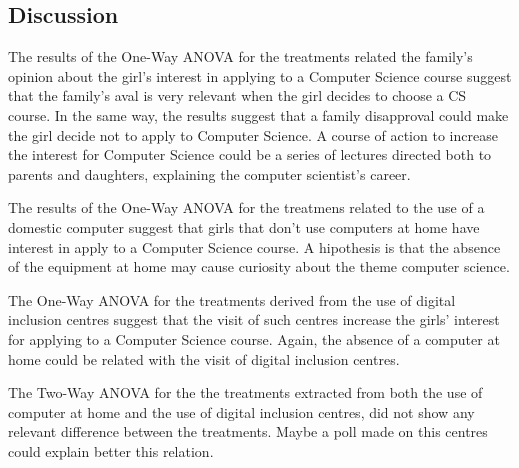 \subsection{Discussion}\label{subsec:discussion}%

The results of the One-Way ANOVA for the treatments related the family's opinion about the girl's interest in applying to a Computer Science course suggest that the family's aval is very relevant when the girl decides to choose a CS course. In the same way, the results suggest that a family disapproval could make the girl decide not to apply to Computer Science. A course of action to increase the interest for Computer Science could be a series of lectures directed both to parents and daughters, explaining the computer scientist's career.

The results of the One-Way ANOVA for the treatmens related to the use of a domestic computer suggest that girls that don't use computers at home have interest in apply to a Computer Science course. A hipothesis is that the absence of the equipment at home may cause curiosity about the theme computer science.

The One-Way ANOVA for the treatments derived from the use of digital inclusion centres suggest that the visit of such centres increase the girls' interest for applying to a Computer Science course. Again, the absence of a computer at home could be related with the visit of digital inclusion centres. 

The Two-Way ANOVA for the the treatments extracted from both the use of computer at home and the use of digital inclusion centres, did not show any relevant difference between the treatments. Maybe a poll made on this centres could explain better this relation.
